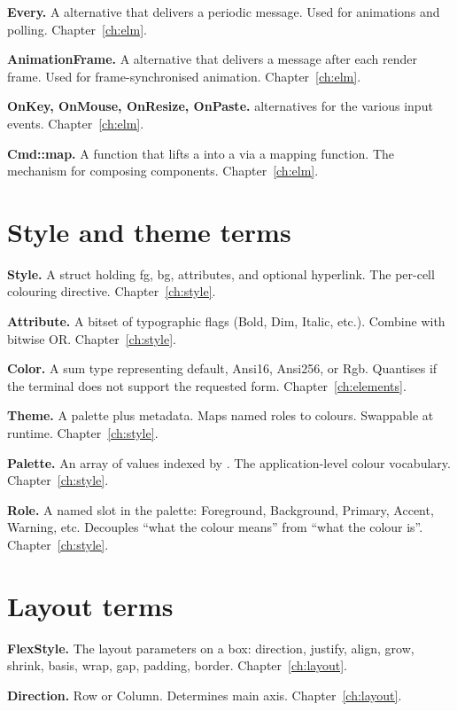 \textbf{Every.} A  alternative that delivers a
periodic message. Used for animations and polling.
Chapter~\ref{ch:elm}.

\textbf{AnimationFrame.} A  alternative that delivers
a message after each render frame. Used for frame-synchronised
animation. Chapter~\ref{ch:elm}.

\textbf{OnKey, OnMouse, OnResize, OnPaste.} 
alternatives for the various input events. Chapter~\ref{ch:elm}.

\textbf{Cmd::map.} A function that lifts a
 into a  via a
mapping function. The mechanism for composing components.
Chapter~\ref{ch:elm}.

\section{Style and theme terms}

\textbf{Style.} A struct holding fg, bg, attributes, and
optional hyperlink. The per-cell colouring directive.
Chapter~\ref{ch:style}.

\textbf{Attribute.} A bitset of typographic flags (Bold, Dim,
Italic, etc.). Combine with bitwise OR. Chapter~\ref{ch:style}.

\textbf{Color.} A sum type representing default, Ansi16,
Ansi256, or Rgb. Quantises if the terminal does not support
the requested form. Chapter~\ref{ch:elements}.

\textbf{Theme.} A palette plus metadata. Maps named roles to
colours. Swappable at runtime. Chapter~\ref{ch:style}.

\textbf{Palette.} An array of  values indexed by
. The application-level colour vocabulary.
Chapter~\ref{ch:style}.

\textbf{Role.} A named slot in the palette: Foreground,
Background, Primary, Accent, Warning, etc. Decouples ``what
the colour means'' from ``what the colour is''.
Chapter~\ref{ch:style}.

\section{Layout terms}

\textbf{FlexStyle.} The layout parameters on a box: direction,
justify, align, grow, shrink, basis, wrap, gap, padding,
border. Chapter~\ref{ch:layout}.

\textbf{Direction.} Row or Column. Determines main axis.
Chapter~\ref{ch:layout}.

